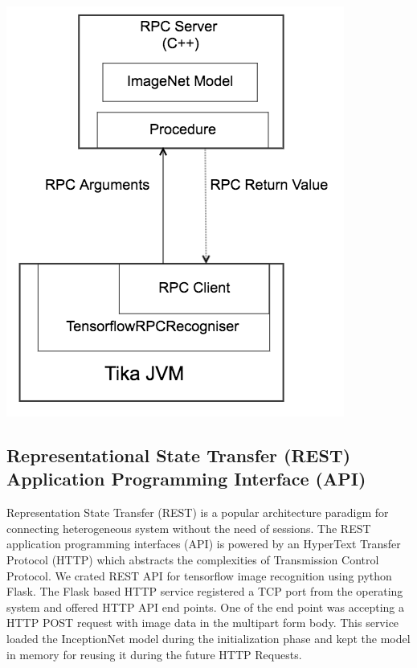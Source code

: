\documentclass[letterpaper, 10 pt, conference]{ieeeconf}  %
\begin{document}
\includegraphics[scale=0.40]{tika-tflow-RPC-design}

\subsection{Representational State Transfer (REST) Application Programming Interface (API)} \label{sec:int-rest}
Representation State Transfer (REST) is a popular architecture paradigm for connecting heterogeneous system without the need of sessions\cite{}. The REST application programming interfaces (API) is powered by an HyperText Transfer Protocol (HTTP) which abstracts the complexities of Transmission Control Protocol.
We crated REST API for tensorflow image recognition using python Flask\cite{}. The Flask based HTTP service registered a TCP port from the operating system and offered HTTP API end points.
One of the end point was accepting a HTTP POST request with image data in the multipart form \cite{} body. This service loaded the InceptionNet \cite{} model during the initialization phase and kept the model in memory for reusing it during the future HTTP Requests.
\end{document}
